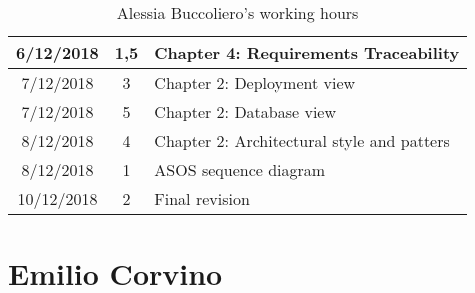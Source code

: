 \begin{table}[H]
{\begin{tabular}{|c|c|m{8cm}|}
        \hline
        6/12/2018 & 1,5 & Chapter 4: Requirements Traceability \\
        \hline
        7/12/2018 & 3 & Chapter 2: Deployment view\\
        \hline
        7/12/2018 & 5 & Chapter 2: Database view \\
        \hline
        8/12/2018 & 4 & Chapter 2: Architectural style and patters \\
        \hline
        8/12/2018 & 1 & ASOS sequence diagram \\
        \hline
        10/12/2018 & 2 & Final revision \\
        \hline
    \end{tabular}}
    \caption{Alessia Buccoliero's working hours}
    \label{Alessia Buccoliero's working hours}
\end{table}


\section{Emilio Corvino}

